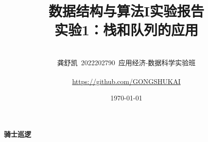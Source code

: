 \documentclass[10pt,a4paper]{article}
\begin{document}
	\title{{\Huge 数据结构与算法I实验报告{\large\linebreak\\}}{\huge 实验1：栈和队列的应用\linebreak\linebreak}}
	\vspace{3cm}
	\author{\\ \Large 龚舒凯\ 2022202790\ 应用经济-数据科学实验班\\
		\hfill\\
		\Large{\url{https://github.com/GONGSHUKAI}}\\
		\hfill}
	
	\date{\today}
	\maketitle
	\newpage
	\begin{center}
		{\huge \textbf{骑士巡逻}}
	\end{center}
\end{document}

